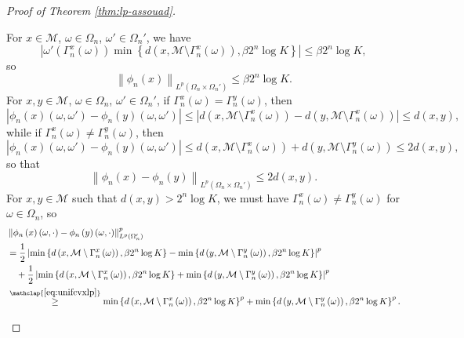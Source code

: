 \documentclass[11pt,reqno]{amsart}
\newcommand{\1}{\mathbf 1}
\begin{document}
\begin{proof}[Proof of Theorem \ref{thm:lp-assouad}]
\begin{enumerate}
For $x\in \mathcal{M}$, $\omega\in \Omega_n$, $\omega'\in \Omega_n'$, we have
\[
\left|\omega'\left(\Gamma^x_n\left(\omega\right)\right)\min\left\{d\left(x,\mathcal{M}\setminus \Gamma^x_n\left(\omega\right)\right),\beta 2^n\log K\right\}\right|\le \beta 2^n\log K,
\]
so 
\begin{equation}\label{eq:assouad-linfty}
\left\|\phi_n\left(x\right)\right\|_{L^p\left(\Omega_n\times\Omega_n'\right)}\le \beta 2^n\log K.
\end{equation}
For $x,y\in \mathcal{M}$, $\omega\in \Omega_n$, $\omega'\in \Omega_n'$, if $\Gamma^x_n\left(\omega\right)=\Gamma^y_n\left(\omega\right)$, then
\[
\left|\phi_n\left(x\right)\left(\omega,\omega'\right)-\phi_n\left(y\right)\left(\omega,\omega'\right)\right|\le \left|d\left(x,\mathcal{M}\setminus \Gamma^x_n\left(\omega\right)\right)-d\left(y,\mathcal{M}\setminus \Gamma^x_n\left(\omega\right)\right)\right|\le d\left(x,y\right),
\]
while if $\Gamma^x_n\left(\omega\right)\neq \Gamma^y_n\left(\omega\right)$, then
\[
\left|\phi_n\left(x\right)\left(\omega,\omega'\right)-\phi_n\left(y\right)\left(\omega,\omega'\right)\right|\le d\left(x,\mathcal{M}\setminus \Gamma^x_n\left(\omega\right)\right)+d\left(y,\mathcal{M}\setminus \Gamma^y_n\left(\omega\right)\right)\le 2d\left(x,y\right),
\]
so that
\begin{equation}\label{eq:assouad-lipschitz}
\left\|\phi_n\left(x\right)-\phi_n\left(y\right)\right\|_{L^p\left(\Omega_n\times \Omega_n'\right)}\le 2d\left(x,y\right).
\end{equation}
For $x,y\in \mathcal{M}$ such that $d\left(x,y\right)>2^n\log K$, we must have $\Gamma^x_n\left(\omega\right)\neq \Gamma^y_n\left(\omega\right)$ for $\omega\in \Omega_n$, so
\begin{align*}
&\left\|\phi_n\left(x\right)\left(\omega,\cdot\right)-\phi_n\left(y\right)\left(\omega,\cdot\right)\right\|^p_{L^p\left(\Omega_n'\right)}\\
&=\frac 12\left|\min\left\{d\left(x,\mathcal{M}\setminus \Gamma^x_n\left(\omega\right)\right),\beta 2^n\log K\right\}-\min\left\{d\left(y,\mathcal{M}\setminus \Gamma^y_n\left(\omega\right)\right),\beta 2^n\log K\right\}\right|^p\\
&\quad +\frac 12\left|\min\left\{d\left(x,\mathcal{M}\setminus \Gamma^x_n\left(\omega\right)\right),\beta 2^n\log K\right\}+\min\left\{d\left(y,\mathcal{M}\setminus \Gamma^y_n\left(\omega\right)\right),\beta 2^n\log K\right\}\right|^p\\
&\stackrel{\mathclap{\eqref{eq:unifcvxlp}}}{\ge} \min\left\{d\left(x,\mathcal{M}\setminus \Gamma^x_n\left(\omega\right)\right),\beta 2^n\log K\right\}^p+\min\left\{d\left(y,\mathcal{M}\setminus \Gamma^y_n\left(\omega\right)\right),\beta 2^n\log K\right\}^p.

\end{align*}
\end{enumerate}
\end{proof}
\end{document}
